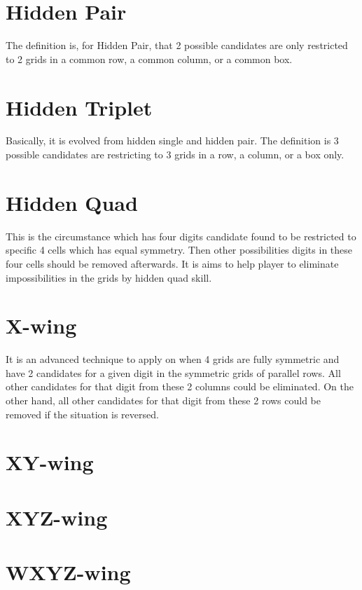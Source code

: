 \documentclass[11pt]{report}
\begin{document}
\section{Hidden Pair}
\label{sec:Hidden Pair}
The definition is, for Hidden Pair, that 2 possible candidates are only restricted to 2 grids in a common row, a common column, or a common box. 

\section{Hidden Triplet}
\label{sec:Hidden Triplet}
Basically, it is evolved from hidden single and hidden pair. The definition is 3 possible candidates are restricting to 3 grids in a row, a column, or a box only.

\section{Hidden Quad}
\label{sec:Hidden Quad}
This is the circumstance which has four digits candidate found to be restricted to specific 4 cells which has equal symmetry. Then other possibilities digits in these four cells should be removed afterwards. It is aims to help player to eliminate impossibilities in the grids by hidden quad skill. 

\section{X-wing}
\label{sec:X-wing}
It is an advanced technique to apply on when 4 grids are fully symmetric and have 2 candidates for a given digit in the symmetric grids of parallel rows. All other candidates for that digit from these 2 columns could be eliminated. On the other hand, all other candidates for that digit from these 2 rows could be removed if the situation is reversed.

\section{XY-wing}
\label{sec:XY-wing}

\section{XYZ-wing}
\label{sec:XYZ-wing}

\section{WXYZ-wing}
\label{sec:WXYZ-wing}
\end{document}
